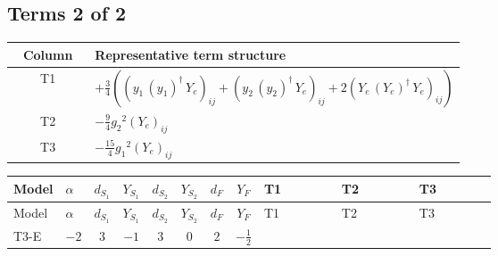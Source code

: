 \documentclass[8pt]{article}
\begin{document}
\begin{landscape}
\subsection*{Terms 2 of 2}
\begin{center}
\begin{tabular}{@{}c >{\raggedright\arraybackslash}p{0.82\linewidth}@{}}
\toprule
Column & Representative term structure \\
\midrule
T1 & \(\displaystyle +\frac{3}{4} (\left({y_1}\,\left({y_1}\right)^{\dagger}\,{Y_e}\right)_{ij}+\left({y_2}\,\left({y_2}\right)^{\dagger}\,{Y_e}\right)_{ij}+2 \left({Y_e}\,\left({Y_e}\right)^{\dagger}\,{Y_e}\right)_{ij})\) \\
\midrule
T2 & \(\displaystyle -\frac{9}{4} {g_2}^2 \left({Y_e}\right)_{ij}\) \\
\midrule
T3 & \(\displaystyle -\frac{15}{4} {g_1}^2 \left({Y_e}\right)_{ij}\) \\
\midrule
\bottomrule
\end{tabular}
\end{center}
\smallskip
\tiny
\begin{longtable}{@{}llcccccc >{\raggedright\arraybackslash}p{0.21\linewidth} >{\raggedright\arraybackslash}p{0.21\linewidth} >{\raggedright\arraybackslash}p{0.21\linewidth}@{}}
\toprule
Model & $\alpha$ & $d_{S_1}$ & $Y_{S_1}$ & $d_{S_2}$ & $Y_{S_2}$ & $d_F$ & $Y_F$ & T1 & T2 & T3 \\
\midrule
\endfirsthead
\toprule
Model & $\alpha$ & $d_{S_1}$ & $Y_{S_1}$ & $d_{S_2}$ & $Y_{S_2}$ & $d_F$ & $Y_F$ & T1 & T2 & T3 \\
\midrule
\endhead
T3-E & $-2$ & $3$ & $-1$ & $3$ & $0$ & $2$ & $-\frac{1}{2}$ & \scriptsize\adjustbox{max width=\linewidth}{$\begin{gathered} +\frac{3}{4} (\left({y_1}\,\left({y_1}\right)^{\dagger}\,{Y_e}\right)_{ij}+\left({y_2}\,\left({y_2}\right)^{\dagger}\,{Y_e}\right)_{ij}+2 \left({Y_e}\,\left({Y_e}\right)^{\dagger}\,{Y_e}\right)_{ij})\end{gathered}$} & \scriptsize\adjustbox{max width=\linewidth}{$\begin{gathered} -\frac{9}{4} {g_2}^2 \left({Y_e}\right)_{ij}\end{gathered}$} & \scriptsize\adjustbox{max width=\linewidth}{$\begin{gathered} -\frac{15}{4} {g_1}^2 \left({Y_e}\right)_{ij}\end{gathered}$} \\
\midrule
\bottomrule
\end{longtable}
\clearpage

\end{landscape}
\end{document}

